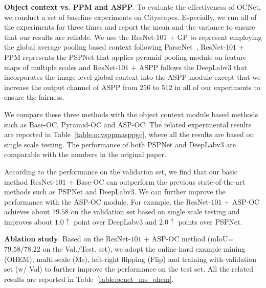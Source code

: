 \documentclass[10pt,twocolumn,letterpaper]{article}
\begin{document}
\vspace{0.1cm}
\noindent\textbf{Object context vs. PPM and ASPP}.
To evaluate the effectiveness of OCNet, we conduct a set of baseline experiments on Cityscapes.
Especially, we run all of the experiments for three times and report the mean and the variance to ensure that our results are reliable. 
We use the ResNet-$101$ + GP to represent employing the global average pooling based context following ParseNet~\cite{liu2015parsenet}, ResNet-$101$ + PPM represents the PSPNet that applies pyramid pooling module on feature maps of multiple scales and ResNet-$101$ + ASPP follows the DeepLabv3 that incorporates the image-level global context into the ASPP module except that we increase the output channel of ASPP from $256$ to $512$ in all of our experiments to ensure the fairness. 

We compare these three methods with the object context module based methods such as Base-OC, Pyramid-OC and ASP-OC. The related experimental results are reported in Table~\ref{table:ocvsppmasppgc}, where all the results are based on single scale testing.
The performance of both PSPNet and DeepLabv3 are comparable with the numbers in the original paper.


According to the performance on the validation set,
we find that our basic method ResNet-$101$ + Base-OC can outperform the previous state-of-the-art methods such as PSPNet and DeepLabv3. 
We can further improve the performance with the ASP-OC module. For example, the ResNet-$101$ + ASP-OC achieves about $79.58$ on the validation set based on single scale testing and improves about $1.0 \uparrow $ point over DeepLabv3 and $2.0 \uparrow $ points over PSPNet. 


\vspace{0.1cm}
\noindent\textbf{Ablation study}.
Based on the ResNet-$101$ + ASP-OC method (mIoU=$79.58/78.22$ on the Val./Test. set), we adopt the online hard example mining (OHEM), multi-scale (Ms), left-right flipping (Flip) and training with validation set (w/ Val)  to further improve the performance on the test set.
All the related results are reported in Table~\ref{table:ocnet_ms_ohem}.
\end{document}
